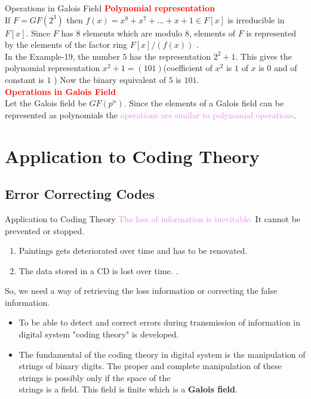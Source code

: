 \documentclass{beamer}
\begin{document}
\begin{frame}{Operations in Galois Field}
\textcolor{red}{\textbf{Polynomial representation}}\\[2mm]
If \(F=GF(2^3)\) then \textcolor{green!50!black}{\(f(x)=x^8+x^7+...+x+1 \in F[x]\)} is irreducible in \(F[x]\). Since \(F\) has \(8\) elements which are modulo \(8\), elements of \(F\) is represented by the elements of the factor ring \(F[x]/(f(x))\) \cite{aes}. \\[5mm]


In the Example-19, the number \textcolor{green!50!black}{\(5\) has the representation \(2^2+1\). This gives the polynomial representation \(x^2+1=(101)\)}(coefficient of \(x^2\) is \(1\) of \(x\) is \(0\) and of constant is \(1\) ) Now the binary equivalent of \(5\) is \(101\).\\[5mm]

\textcolor{red}{\textbf{Operations in Galois Field}}\\[2mm]
Let the Galois field be \(GF(p^n)\). Since the elements of a Galois field can be represented as polynomials the \textcolor{violet}{ operations are similar to polynomial operations}.
\end{frame}

\section{Application to Coding Theory}
\subsection{Error Correcting Codes}
\begin{frame}{Application to Coding Theory}
\textcolor{violet}{The loss of information is inevitable.} It cannot be prevented or stopped.
\begin{enumerate}

\item Paintings gets deteriorated over time and has to be renovated.
\item The data stored in a CD is lost over time. \cite{coding}.
\end{enumerate}
\vspace{3mm}

So, we need a way of retrieving the loss information or correcting the false information.
\vspace{2mm}

\begin{itemize}
\item  \textcolor{green!50!black}{To be able to detect and correct errors during transmission} of information in digital system "coding theory" is developed.
  \vspace{1mm}

\item \textcolor{green!50!black}{The fundamental of the coding theory in digital system is the manipulation of strings of binary digits}. The proper and complete manipulation of these strings is possibly only if the space of the \\
  strings is a field. This field is finite which is a \textbf{Galois field}.
  \end{itemize}
\end{frame}
\end{document}
